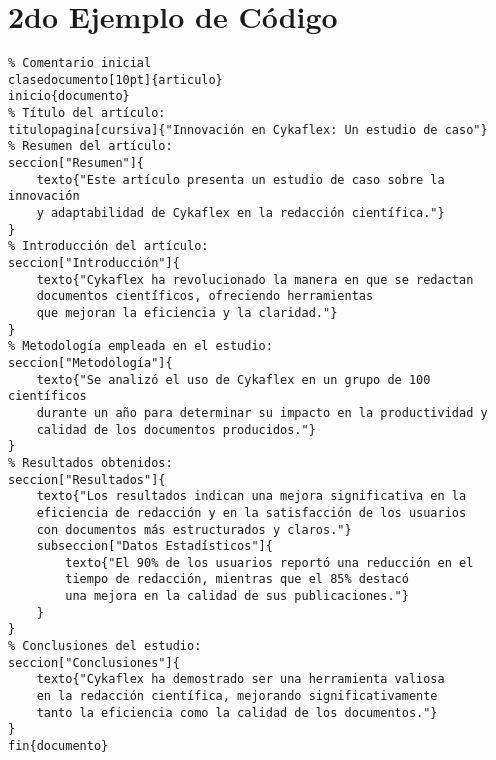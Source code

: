\documentclass[12pt]{article}
\begin{document}
\section{2do Ejemplo de Código}
        \begin{center}
        \begin{verbatim}
% Comentario inicial
clasedocumento[10pt]{articulo}
inicio{documento}
% Título del artículo:
titulopagina[cursiva]{"Innovación en Cykaflex: Un estudio de caso"}
% Resumen del artículo:
seccion["Resumen"]{
    texto{"Este artículo presenta un estudio de caso sobre la innovación 
    y adaptabilidad de Cykaflex en la redacción científica."}
}
% Introducción del artículo:
seccion["Introducción"]{
    texto{"Cykaflex ha revolucionado la manera en que se redactan 
    documentos científicos, ofreciendo herramientas 
    que mejoran la eficiencia y la claridad."}
}
% Metodología empleada en el estudio:
seccion["Metodología"]{
    texto{"Se analizó el uso de Cykaflex en un grupo de 100 científicos 
    durante un año para determinar su impacto en la productividad y 
    calidad de los documentos producidos."}
}
% Resultados obtenidos:
seccion["Resultados"]{
    texto{"Los resultados indican una mejora significativa en la 
    eficiencia de redacción y en la satisfacción de los usuarios 
    con documentos más estructurados y claros."}
    subseccion["Datos Estadísticos"]{
        texto{"El 90% de los usuarios reportó una reducción en el
        tiempo de redacción, mientras que el 85% destacó 
        una mejora en la calidad de sus publicaciones."}
    }
}
% Conclusiones del estudio:
seccion["Conclusiones"]{
    texto{"Cykaflex ha demostrado ser una herramienta valiosa 
    en la redacción científica, mejorando significativamente 
    tanto la eficiencia como la calidad de los documentos."}
}
fin{documento}
        \end{verbatim}
        \end{center}
\end{document}
